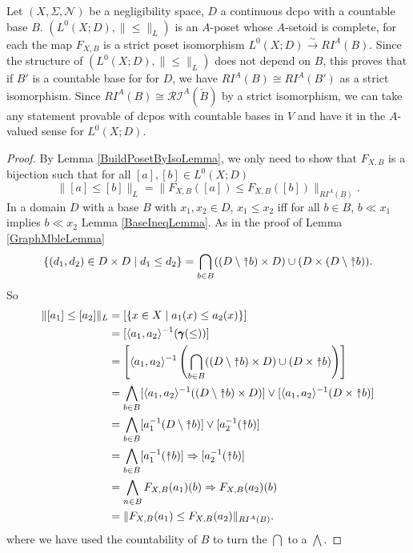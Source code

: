 \documentclass{lmcs}
\newcommand{\uu}{\rotatebox[origin=c]{90}{$\twoheadrightarrow$}}
\newcommand{\En}{\mathcal{N}}
\newcommand{\bleq}{\|\mbox{$\leq$}\|}
\newcommand{\graph}{\pmb{\gamma}}
\newcommand{\RI}{\mathcal{RI}} %
\newcommand{\isoarrow}{\stackrel{\sim}{\rightarrow}}
\newcommand{\bvs}[1]{\| {#1} \|}
\begin{document}
\begin{thm}
\label{RandVarsContTheorem}
Let $(X,\Sigma,\En)$ be a negligibility space, $D$ a continuous dcpo with a countable base $B$. $(L^0(X;D),\bleq_L)$ is an $A$-poset whose $A$-setoid is complete, for each  the map $F_{X,B}$ is a strict poset isomorphism $L^0(X;D) \isoarrow RI^A(B)$. Since the structure of $(L^0(X;D),\bleq_L)$ does not depend on $B$, this proves that if $B'$ is a countable base for for $D$, we have $RI^A(B) \cong RI^A(B')$ as a strict isomorphism. Since $RI^A(B) \cong \RI^A(\check{B})$ by a strict isomorphism, we can take any statement provable of dcpos with countable bases in $V$ and have it in the $A$-valued sense for $L^0(X;D)$. 
\end{thm}
\begin{proof}
By Lemma \ref{BuildPosetByIsoLemma}, we only need to show that $F_{X,B}$ is a bijection such that for all $[a],[b] \in L^0(X;D)$
\begin{equation}
\label{LPosetEmbedEqn}
\bvs{[a] \leq [b]}_L = \bvs{F_{X,B}([a]) \leq F_{X,B}([b])}_{RI^A(B)}.
\end{equation}
In a domain $D$ with a base $B$ with $x_1,x_2 \in D$, $x_1 \leq x_2$ iff for all $b \in B$, $b \ll x_1$ implies $b \ll x_2$ Lemma \ref{BaseIneqLemma}. As in the proof of Lemma \ref{GraphMbleLemma}
\[
\{ (d_1,d_2) \in D\times D \mid d_1 \leq d_2 \} = \bigcap_{b \in B} ((D \setminus \uu b) \times D) \cup (D \times (D \setminus \uu b)).
\]
So
\begin{align*}
\bvs{[a_1] \leq [a_2]}_L &= [\{ x \in X \mid a_1(x) \leq a_2(x) \}] \\
 &= [\langle a_1, a_2 \rangle^{-1}(\graph(\leq))] \\
 &= \left[\langle a_1, a_2 \rangle^{-1} \left(\bigcap_{b \in B} ((D \setminus \uu b) \times D) \cup (D \times \uu b)\right)\right] \\
 &= \bigwedge_{b \in B} [\langle a_1, a_2 \rangle^{-1}((D \setminus \uu b) \times D)] \lor [\langle a_1, a_2 \rangle^{-1}(D \times \uu b)] \\
 &= \bigwedge_{b \in B} [a_1^{-1}(D \setminus \uu b)] \lor [a_2^{-1}(\uu b)] \\
 &= \bigwedge_{b \in B} [a_1^{-1}(\uu b)] \Rightarrow [a_2^{-1}(\uu b)] \\
 &= \bigwedge_{n \in B} F_{X,B}(a_1)(b) \Rightarrow F_{X,B}(a_2)(b) \\
 &= \bvs{F_{X,B}(a_1) \leq F_{X,B}(a_2)}_{RI^A(B)}.
\end{align*}
where we have used the countability of $B$ to turn the $\bigcap$ to a $\bigwedge$. 


\end{proof}
\end{document}
